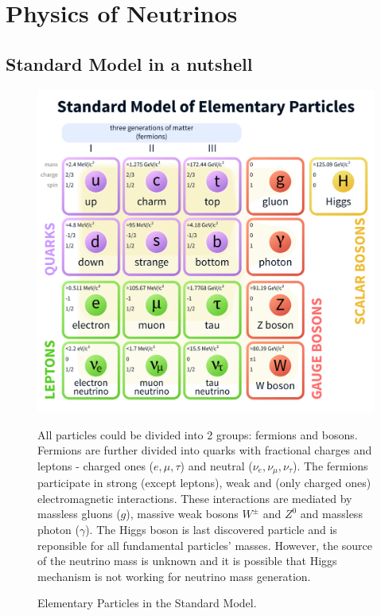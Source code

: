 \chapter{Physics of Neutrinos}
\label{neutrino_physics_chapter}

\section{Standard Model in a nutshell}
\begin{figure}
\includegraphics[width=1.0\textwidth]{figures/Standard_Model_of_Elementary_Particles.png}\\%
\caption{Elementary Particles in the Standard Model.} 
{All particles could be divided into 2 groups: fermions and bosons. Fermions are 
further divided into quarks with fractional charges and leptons - charged ones ($e, \mu, \tau$)
and neutral ($\nu_e, \nu_\mu, \nu_{\tau}$). The fermions participate in strong (except leptons), 
weak and (only charged ones) electromagnetic interactions. These interactions are 
mediated by massless gluons ($g$), massive weak bosons $W^{\pm}$ and $Z^0$ and massless
photon ($\gamma$). The Higgs boson is last discovered particle and is reponsible for all fundamental 
particles' masses. However, the source of the neutrino mass is unknown and it is possible that 
Higgs mechanism is not working for neutrino mass generation.}
\end{figure}
